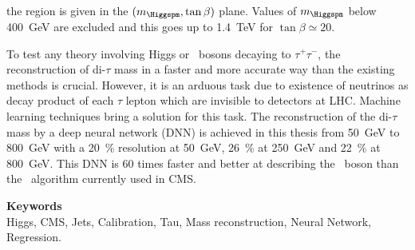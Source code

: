 the region is given in the $(m_{\Higgspm},\tan\beta)$ plane.
Values of $m_{\Higgspm}$ below \SI{400}{\GeV} are excluded
and this goes up to 
\SI{1.4}{\TeV} for $\tan\beta\simeq\num{20}$.
\par
To test any theory involving Higgs or \Zboson\ bosons decaying to $\tau^+ \tau^-$,
the reconstruction of di-$\tau$ mass in a faster and more accurate way than the existing methods is crucial. 
However, it is an arduous task due to existence of neutrinos as decay product of each $\tau$ lepton which are invisible to detectors at LHC. 
Machine learning techniques bring a solution for this task. 
The reconstruction of the di-$\tau$ mass by a deep neural network (DNN)
is achieved in this thesis
from 
\SI{50}{\GeV} to \SI{800}{\GeV}
with a
\SI{20}{\%} resolution at \SI{50}{\GeV},
\SI{26}{\%} at \SI{250}{\GeV} and
\SI{22}{\%} at \SI{800}{\GeV}.
This DNN is
60 times faster
and
better at describing the \Zboson~boson
than the \SVFIT\ algorithm currently used in CMS.

\vfill

\noindent\textbf{\Large\sffamily Keywords}\\
Higgs,
CMS,
Jets,
Calibration,
Tau,
Mass reconstruction,
Neural Network,
Regression.

\vspace{2\baselineskip}